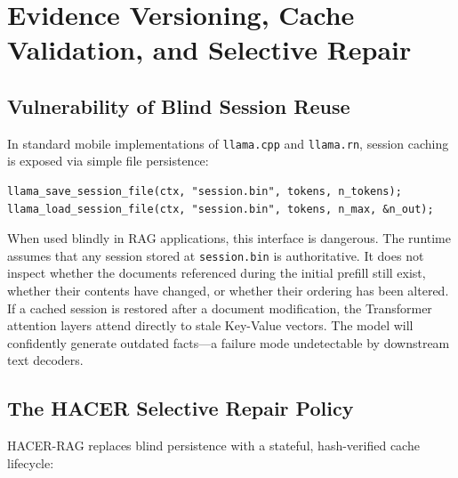 \section{Evidence Versioning, Cache Validation, and Selective Repair}
\label{sec:versioning_repair}

\subsection{Vulnerability of Blind Session Reuse}
In standard mobile implementations of \texttt{llama.cpp} and \texttt{llama.rn}, session caching is exposed via simple file persistence:
\begin{verbatim}
llama_save_session_file(ctx, "session.bin", tokens, n_tokens);
llama_load_session_file(ctx, "session.bin", tokens, n_max, &n_out);
\end{verbatim}
When used blindly in RAG applications, this interface is dangerous. The runtime assumes that any session stored at \texttt{session.bin} is authoritative. It does not inspect whether the documents referenced during the initial prefill still exist, whether their contents have changed, or whether their ordering has been altered. If a cached session is restored after a document modification, the Transformer attention layers attend directly to stale Key-Value vectors. The model will confidently generate outdated facts—a failure mode undetectable by downstream text decoders.

\subsection{The HACER Selective Repair Policy}
HACER-RAG replaces blind persistence with a stateful, hash-verified cache lifecycle:


